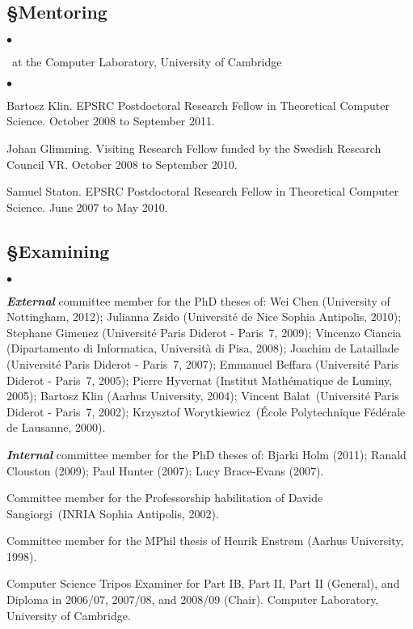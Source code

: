 \documentclass[11pt,twocolumn]{article}
\newenvironment{myitemize}
  {\begin{list}{$\bullet$}
  {\setlength{\topsep}{1pt}
   \setlength{\partopsep}{1pt}
   \setlength{\itemsep}{0pt}
   \setlength{\parsep}{0pt}
   \setlength{\leftmargin}{1em}
   \setlength{\labelwidth}{.5em}}}
  {\end{list}}
\begin{document}
\subsection*{\S\enspace\thinspace Mentoring}
\vspace*{-2mm}
\begin{myitemize}
\item[]\small\ at the Computer Laboratory, University of Cambridge
\end{myitemize}

\begin{myitemize}
\item
Bartosz Klin.  EPSRC Postdoctoral Research Fellow in Theoretical Computer
Science.  October 2008 to September 2011.  

\item
Johan Glimming.  Visiting Research Fellow funded by the Swedish Research
Council VR.  October 2008 to September 2010.  

\item
Samuel Staton.  EPSRC Postdoctoral Research Fellow in Theoretical Computer
Science.  June 2007 to May 2010.  
\end{myitemize}

\subsection*{\S\enspace\thinspace Examining}

\begin{myitemize}
\item
\textbf{\em External} committee member for the PhD theses of: 
%
Wei Chen (University of Nottingham, 2012);
%
Julianna Zsido (Universit\'e de Nice Sophia Antipolis, 2010); 
%
Stephane Gimenez (Universit\'e Paris Diderot - Paris~7, 2009); 
%
Vincenzo Ciancia (Dipartamento di Informatica, Universit\`a di Pisa,
2008); 
%
Joachim de Lataillade (Universit\'e Paris Diderot - Paris~7, 2007); 
%
Emmanuel Beffara (Universit\'e Paris Diderot - Paris~7, 2005); 
%
Pierre Hyvernat (Institut Math\'ematique de Luminy, 2005);
%
Bartosz Klin (Aarhus University, 2004);
%
Vincent Balat~(Universit\'e Paris Diderot - Paris~7, 2002);
%
Krzysztof Worytkiewicz~(\'Ecole Polytechnique F\'ed\'erale de Lausanne,
2000).

\item
\textbf{\em Internal} committee member for the PhD theses of: 
%
Bjarki Holm (2011); 
%
Ranald Clouston (2009); 
%
Paul Hunter (2007); 
%
Lucy Brace-Evans (2007).

\item
Committee member for the Professorship habilitation of
%
Davide Sangiorgi~(INRIA Sophia Antipolis, 2002).

\item
Committee member for the MPhil thesis of
%
Henrik Enstr{\o}m (Aarhus University, 1998).

\item
Computer Science Tripos Examiner for Part IB, Part II, Part II (General),
and Diploma in 2006/07, 2007/08, and 2008/09 (Chair).  
Computer Laboratory, University of Cambridge.  
\end{myitemize}
\end{document}
